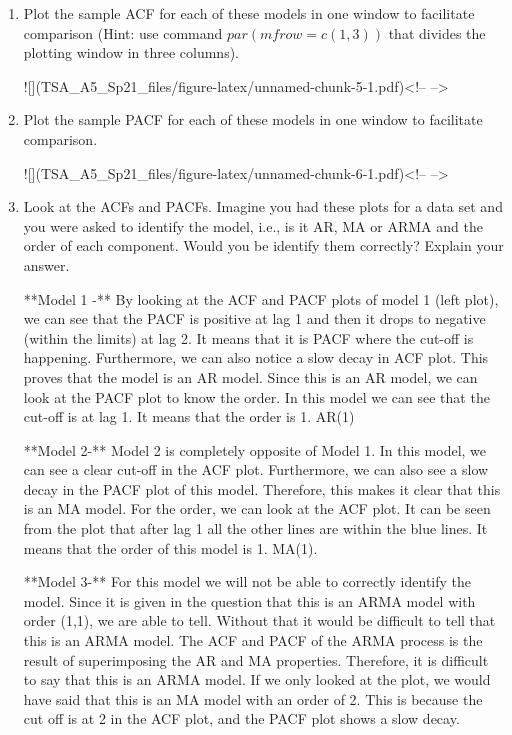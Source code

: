 \documentclass[
]{article}
\begin{document}
\begin{enumerate}[label=(\alph*)]

\item Plot the sample ACF for each of these models in one window to facilitate comparison (Hint: use command $par(mfrow=c(1,3))$ that divides the plotting window in three columns).  

![](TSA_A5_Sp21_files/figure-latex/unnamed-chunk-5-1.pdf)<!-- --> 


\item Plot the sample PACF for each of these models in one window to facilitate comparison.  

![](TSA_A5_Sp21_files/figure-latex/unnamed-chunk-6-1.pdf)<!-- --> 

\item Look at the ACFs and PACFs. Imagine you had these plots for a data set and you were asked to identify the model, i.e., is it AR, MA or ARMA and the order of each component. Would you be identify them correctly? Explain your answer.

**Model 1 -** By looking at the ACF and PACF plots of model 1 (left plot), we can see that the PACF is positive at lag 1 and then it drops to negative (within the limits) at lag 2. It means that it is PACF where the cut-off is happening. Furthermore, we can also notice a slow decay in ACF plot. This proves that the model is an AR model. Since this is an AR model, we can look at the PACF plot to know the order. In this model we can see that the cut-off is at lag 1. It means that the order is 1. AR(1)

**Model 2-** Model 2 is completely opposite of Model 1. In this model, we can see a clear cut-off in the ACF plot. Furthermore, we can also see a slow decay in the PACF plot of this model. Therefore, this makes it clear that this is an MA model. For the order, we can look at the ACF plot. It can be seen from the plot that after lag 1 all the other lines are within the blue lines. It means that the order of this model is 1. MA(1).

**Model 3-** For this model we will not be able to correctly identify the model. Since it is given in the question that this is an ARMA model with order (1,1), we are able to tell. Without that it would be difficult to tell that this is an ARMA model. The ACF and PACF of the ARMA process is the result of superimposing the AR and MA properties. Therefore, it is difficult to say that this is an ARMA model. If we only looked at the plot, we would have said that this is an MA model with an order of 2. This is because the cut off is at 2 in the ACF plot, and the PACF plot shows a slow decay.


\end{enumerate}
\end{document}
